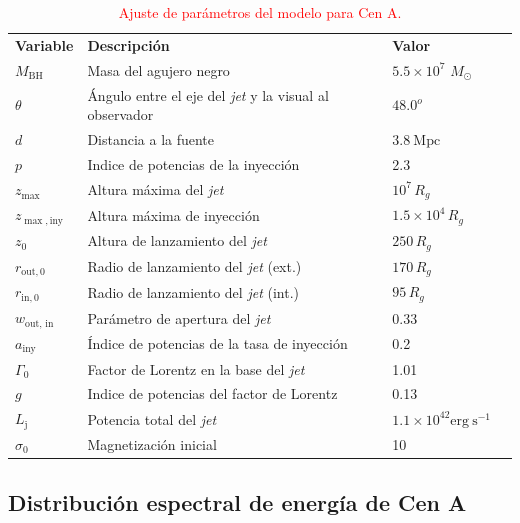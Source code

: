 \begin{table}[h!]
\centering

\begin{tabular}{llll}
\\
\hline
\textbf{Variable} & \textbf{Descripci\'on} & \textbf{Valor} \\
$M_\mathrm{BH}$ & Masa del agujero negro & $5.5 \times 10^{7}$ $M_\odot$\\
$\theta$ & \'Angulo entre el eje del \textit{jet} y la visual al observador & $48.0^o$\\
$d$ & Distancia a la fuente & $3.8~\mathrm{Mpc}$ \\
\hline
$p$ & Indice de potencias de la inyecci\'on & 2.3 \\
\hline
$z_{\max}$ & Altura máxima del \textit{jet} & $10^{7} \, R_{g}$\\
$z_{\max, \text{iny}}$ & Altura m\'axima de inyección & $1.5 \times 10^{4} \, R_{g}$\\
$z_0$ & Altura de lanzamiento  del \textit{jet}& $250 \, R_{g}$ \\
\hline
$r_{\text{out},0}$ & Radio de lanzamiento del \textit{jet} (ext.)& $170 \, R_{g}$ \\
$r_{\text{in},0}$ & Radio de lanzamiento del \textit{jet} (int.) & $95 \, R_{g}$ \\
$w_{\text{out, in}}$ & Parámetro de apertura del \textit{jet}  & 0.33 \\
\hline
$a_{\text{iny}}$ & \'Indice de potencias de la tasa de inyecci\'on& 0.2 \\
\hline
$\Gamma_{0}$ & Factor de Lorentz en la base del \textit{jet} & 1.01\\

$g$ & Indice de potencias del factor de Lorentz & 0.13 \\
\hline
$L_\mathrm{j}$ & Potencia total del \textit{jet} & $1.1 \times 10^{42} \mathrm{erg ~s^{-1}}$ \\
\hline
$\sigma_{0}$ & Magnetizaci\'on inicial & 10 \\
\hline
\end{tabular}
\caption{\textcolor{red}{Ajuste de parámetros del modelo para Cen A.}}
\end{table}

\newpage


\subsection{Distribuci\'on espectral de energía de Cen A}

